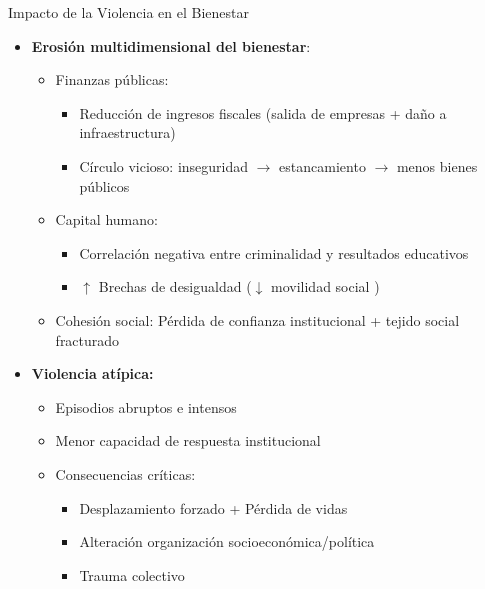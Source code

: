 \begin{frame}{Impacto de la Violencia en el Bienestar}
    \begin{itemize}
        \item \textbf{Erosión multidimensional del bienestar}:
        \begin{itemize}
            \pause
            \item \alert{Finanzas públicas}: 
            \begin{itemize}
                \scriptsize
                \item Reducción de ingresos fiscales (salida de empresas + daño a infraestructura)
                \item Círculo vicioso: inseguridad $\rightarrow$ estancamiento $\rightarrow$ menos bienes públicos
            \end{itemize}
            \pause
            \item \alert{Capital humano:}
            \begin{itemize}
                \scriptsize
                \item Correlación negativa entre criminalidad y resultados educativos
                \item $\uparrow$ Brechas de desigualdad ($\downarrow$ movilidad social )
            \end{itemize}
            \pause
            \item \alert{Cohesión social}: Pérdida de confianza institucional + tejido social fracturado
        \end{itemize}
        
        \vspace{0.1cm}
        \pause
        \item \textbf{Violencia atípica:}
        \begin{itemize}
            \pause
            \item Episodios \alert{abruptos} e \alert{intensos}
            \item Menor capacidad de respuesta institucional
            \item Consecuencias críticas:
            \begin{itemize}
                \scriptsize
                \item Desplazamiento forzado + Pérdida de vidas
                \item Alteración organización socioeconómica/política
                \item Trauma colectivo
            \end{itemize}
        \end{itemize}
    \end{itemize}

\end{frame}

